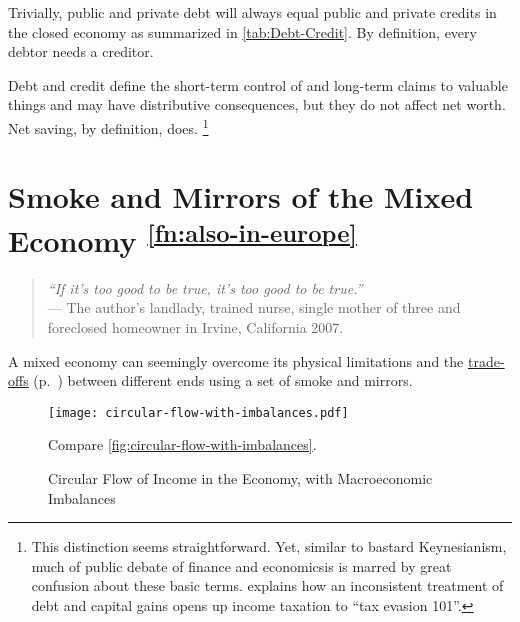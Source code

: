 \begin{enumerate}
	Trivially, public and private debt will always equal public and private credits in the closed economy as summarized in \autoref{tab:Debt-Credit}.
By definition, every debtor needs a creditor.

	Debt and credit define the short-term control of and long-term claims to valuable things and may have distributive consequences, but they do not affect net worth.
Net saving, by definition, does.
\footnote{
	This distinction seems straightforward.
	Yet, similar to bastard Keynesianism, much of public debate of finance and economicsis is marred by great confusion about these basic terms.
	\citealt{McCaffery2005} explains how an inconsistent treatment of debt and capital gains opens up income taxation to ``tax evasion 101''.
}
\end{enumerate}

\section[Smoke \& Mirrors]{Smoke and Mirrors of the Mixed Economy \textsuperscript{\ref{fn:also-in-europe}}} \label{sec:smoke-n-mirrors}

\begin{quote}
	\emph{``If it's too good to be true, it's too good to be true.''\\}
	--- The author's landlady, trained nurse, single mother of three and foreclosed homeowner in Irvine, California 2007.
\end{quote}


A mixed economy can seemingly overcome its physical limitations and the \hyperref[sec:trade-offs]{trade-offs} (p.~\pageref{sec:trade-offs}) between different ends using a set of smoke and mirrors.

\begin{figure}[htbp]
	\centering
	\texttt{[image: circular-flow-with-imbalances.pdf]}
	\caption[Circular Flow in the Economy, with Imbalances]{Circular Flow of Income in the Economy, with Macroeconomic Imbalances}
	\begin{flushleft}
		\scriptsize{Compare \autoref{fig:circular-flow-with-imbalances}.}
	\end{flushleft}
	\label{fig:circular-flow-with-imbalances}
\end{figure}

